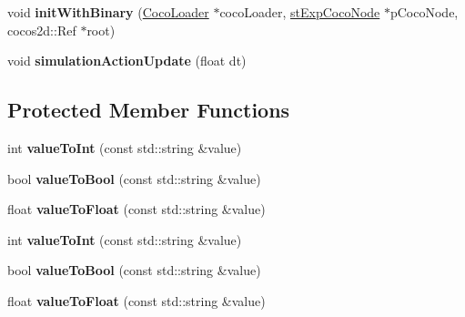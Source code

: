 \begin{DoxyCompactItemize}
\item 
\mbox{\label{classcocostudio_1_1ActionObject_ab0f89c380631ddd77de76a7179920be1}} 
void {\bfseries init\+With\+Binary} (\hyperlink{classcocostudio_1_1CocoLoader}{Coco\+Loader} $\ast$coco\+Loader, \hyperlink{structcocostudio_1_1stExpCocoNode}{st\+Exp\+Coco\+Node} $\ast$p\+Coco\+Node, cocos2d\+::\+Ref $\ast$root)
\item 
\mbox{\label{classcocostudio_1_1ActionObject_a77106af52d905a519c10d1efbb747c5f}} 
void {\bfseries simulation\+Action\+Update} (float dt)
\end{DoxyCompactItemize}
\subsection*{Protected Member Functions}
\begin{DoxyCompactItemize}
\item 
\mbox{\label{classcocostudio_1_1ActionObject_ab0aaba1a8cc81d72abf352cdda486e7d}} 
int {\bfseries value\+To\+Int} (const std\+::string \&value)
\item 
\mbox{\label{classcocostudio_1_1ActionObject_a6af1e7548b0b30a236be977f1ddae7c2}} 
bool {\bfseries value\+To\+Bool} (const std\+::string \&value)
\item 
\mbox{\label{classcocostudio_1_1ActionObject_a3c96b029acf09fc0cdd482db479139b3}} 
float {\bfseries value\+To\+Float} (const std\+::string \&value)
\item 
\mbox{\label{classcocostudio_1_1ActionObject_ab0aaba1a8cc81d72abf352cdda486e7d}} 
int {\bfseries value\+To\+Int} (const std\+::string \&value)
\item 
\mbox{\label{classcocostudio_1_1ActionObject_a6af1e7548b0b30a236be977f1ddae7c2}} 
bool {\bfseries value\+To\+Bool} (const std\+::string \&value)
\item 
\mbox{\label{classcocostudio_1_1ActionObject_a3c96b029acf09fc0cdd482db479139b3}} 
float {\bfseries value\+To\+Float} (const std\+::string \&value)
\end{DoxyCompactItemize}
